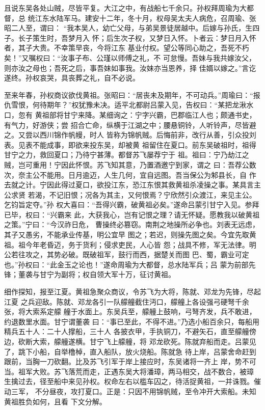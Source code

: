 且说东吴各处山贼，尽皆平复。大江之中，有战船七千余只。孙权拜周瑜为大都督，总
统江东水陆军马。建安十二年，冬十月，权母吴太夫人病危，召周瑜、张昭二人至，谓曰：
“我本吴人，幼亡父母，与弟吴景徒居越中。后嫁与孙氏，生四子。长子策生时，吾梦月入
怀；后生次子权，又梦日入怀。卜者云：梦日月入怀者，其子大贵。不幸策早丧，今将江东
基业付权。望公等同心助之，吾死不朽矣！”又嘱权曰：“汝事子布、公瑾以师傅之礼，不
可怠慢。吾妹与我共嫁汝父，则亦汝之母也；吾死之后，事吾妹如事我。汝妹亦当恩养，择
佳婿以嫁之。”言讫遂终。孙权哀哭，具丧葬之礼，自不必说。

至来年春，孙权商议欲伐黄祖。张昭曰：“居丧未及期年，不可动兵。”周瑜曰：“报
仇雪恨，何待期年？”权犹豫未决。适平北都尉吕蒙入见，告权曰：“某把龙湫水口，忽有
黄祖部将甘宁来降。某细询之：宁字兴霸，巴郡临江人也；颇通书史，有气力，好游侠；尝
招合亡命，纵横于江湖之中；腰悬铜铃，人听铃声，尽皆避之。又尝以西川锦作帆幔，时人
皆称为锦帆贼。后悔前非，改行从善，引众投刘表。见表不能成事，即欲来投东吴，却被黄
祖留住在夏口。前东吴破祖时，祖得甘宁之力，救回夏口；乃待宁甚薄。都督苏飞屡荐宁于
祖。祖曰：宁乃劫江之贼，岂可重用！宁因此怀恨。苏飞知其意，乃置酒邀宁到家，谓之
曰：吾荐公数次，奈主公不能用。日月逾迈，人生几何，宜自远图。吾当保公为邾县长，自
作去就之计。宁因此得过夏口，欲投江东，恐江东恨其救黄祖杀凌操之事。某具言主公求贤
若渴，不记旧恨；况各为其主，又何恨焉？宁欣然引众渡江，来见主公。乞钧旨定夺。”孙
权大喜曰：“吾得兴霸，破黄祖必矣。”遂命吕蒙引甘宁入见。参拜已毕，权曰：“兴霸来
此，大获我心，岂有记恨之理？请无怀疑。愿教我以破黄祖之策。”宁曰：“今汉祚日危，
曹操终必篡窃。南荆之地操所必争也。刘表无远虑，其子又愚劣，不能承业传基，明公宜早
图之；若迟，则操先图之矣。今宜先取黄祖。祖今年老昏迈，务于货利；侵求吏民，人心皆
怨；战具不修，军无法律。明公若往攻之，其势必破。既破祖军，鼓行而西，据楚关而图
巴、蜀，霸业可定也。”孙权曰：“此金玉之论也！”遂命周瑜为大都督，总水陆军兵；吕
蒙为前部先锋；董袭与甘宁为副将；权自领大军十万，征讨黄祖。

细作探知，报至江夏。黄祖急聚众商议，令苏飞为大将，陈就、邓龙为先锋，尽起江夏
之兵迎敌。陈就、邓龙各引一队艨艟截住沔口，艨艟上各设强弓硬弩千余张，将大索系定艨
艟于水面上。东吴兵至，艨艟上鼓响，弓弩齐发，兵不敢进，约退数里水面。甘宁谓董袭
曰：“事已至此，不得不进。”乃选小船百余只，每船用精兵五十人：二十人撑船，三十人
各披衣甲，手执铜刀，不避矢石，直至艨艟傍边，砍断大索，艨艟遂横。甘宁飞上艨艟，将
邓龙砍死。陈就弃船而走。吕蒙见了，跳下小船，自举橹棹，直入船队，放火烧船。陈就急
待上岸，吕蒙舍命赶到跟前，当胸一刀砍翻。比及苏飞引军于岸上接应时，东吴诸将一齐上
岸，势不可当。祖军大败。苏飞落荒而走，正遇东吴大将潘璋，两马相交，战不数合，被璋
生擒过去，径至船中来见孙权。权命左右以槛车囚之，待活捉黄祖，一并诛戮。催动三军，
不分昼夜，攻打夏口。正是：只因不用锦帆贼，至令冲开大索船。未知黄祖胜负如何，且看
下文分解。